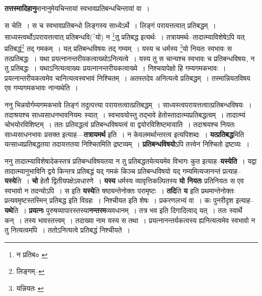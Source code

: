 \documentclass[article,12pt,a4paper]{memoir}
\newcommand{\unclear}[1]{($^{?}$#1)}
\begin{document}
	  \pstart \textbf{तत्तस्मादिहानु}मानानुमेयचिन्तायां स्वभावप्रतिबन्धचिन्तायां वा ।
	\pend
	  \bigskip
	  \begingroup
	

	  \pstart स चेति । स च स्वभावप्रतिबन्धो लिङ्गस्य साध्येऽर्थे । लिङ्गं परायत्तत्वात् प्रतिबद्धम् । साध्यस्त्वर्थोऽपरायत्तत्वात् प्रतिबन्धवि\unclear{यो} न \footnote{न प्रतिब० \cite{dp-msA} \cite{dp-msB} \cite{dp-msD} \cite{dp-edP} \cite{dp-edH} \cite{dp-edE} \cite{dp-edN}}\-तु प्रतिबद्ध इत्यर्थः । तत्रायमर्थः--तादात्म्याविशेषेऽपि यत् प्रतिबद्धं\footnote{लिङ्गम्--\cite{dp-msD-n}} तद् गमकम् । यत् प्रतिबन्धविषयः तद् गम्यम् । यस्य च धर्मस्य \footnote{यन्नियतः \cite{dp-msA} \cite{dp-msB} \cite{dp-msC} \cite{dp-msD} \cite{dp-edP} \cite{dp-edH} \cite{dp-edE} \cite{dp-edN}}\-यो नियतः स्वभावः स तत्प्रतिबद्धः । यथा प्रयत्नानन्तरीयकत्वाख्योऽनित्यत्वे । यस्य तु स चान्यश्च स्वभावः च प्रतिबन्धविषयः, न तु प्रतिबद्धः । यथाऽनित्यत्वाख्यः प्रयत्नानन्तरीयकत्वाख्ये । निश्चयापेक्षो हि गम्यगमकभावः । प्रयत्नान्तरीयकत्वमेव चानित्यत्वस्वभावं निश्चितम् । अतस्तदेव अनित्यत्वे प्रतिबद्धम् । तस्मान्नियतविषय एव गम्यगमकभावः नान्यथेति ।
	\pend
      
	  \endgroup
	

	  \pstart ननु भिन्नयोर्गम्यगमकभावे लिङ्गं तदुत्पत्त्या परायत्तत्वात्प्रतिबद्धम् । साध्यस्त्वपरायत्तत्वात्प्रतिबन्धविषयः । तदाश्रयश्च साध्यसाधनभावनियमः स्यात् । स्वभावयोस्तु तद्भावे हेतोस्तादात्म्यप्रतिबद्धत्वम् । तादात्म्यं चोभयोरविशिष्टम् । ततः प्रतिवद्धत्वं प्रतिबन्धविषयत्वं वा द्वयोरविशिष्टमायाति । तदाश्रयश्च नियतः साध्यसाधनभावः प्रसक्त इत्याह—\textbf{तत्रायमर्थ} इति । न केवलमर्थान्तरत्व इत्यपिशब्दः । \textbf{यत्प्रतिबद्ध}मिति यत्साध्यप्रतिबद्धतया तदायत्ततया निश्चितमिति द्रष्टव्यम् । \textbf{प्रतिबन्धविषयो}ऽपि तत्त्वेन निश्चितो द्रष्टव्यः ।
	\pend
      

	  \pstart ननु तादात्म्याविशेषादेकस्तत्र प्रतिबन्धविषयतया न तु प्रतिबद्धतयेत्ययमेव विभागः कुत इत्याह--\textbf{यस्येति} । यद्वा तादात्म्यानुभाविनि द्वये किन्तत्र प्रतिबद्धं यद् गमकं किञ्च प्रतिबन्धविषयो यद् गम्यमित्यजानन्तं प्रत्याह--\textbf{यस्ये}ति । \textbf{चो} हेतौ द्वितीयपक्षेऽवधारणे । \textbf{यस्य} धर्मस्य व्यावृत्तिकल्पितस्य \textbf{यो नियतः} प्रतिनियतः स एव स्वभावो न तदन्योऽपि । स इति \textbf{यस्ये}ति षष्ठ्यन्तेनोक्तः परामृष्टः । \textbf{तदि}ति \textbf{य} इति प्रथमान्तेनोक्तः प्रत्यवमृष्टस्तस्मिन् प्रतिबद्ध इति विग्रहः । निश्चीयत इति शेषः । प्रकरणलभ्यं वा । कः पुनरीदृश इत्याह--\textbf{यथे}ति । \textbf{प्रयत्नः} पुरुषव्यापारस्तस्या\textbf{नन्तरम}व्यवधानम् । तत्र भव इति दिगादित्वाद् यत् । ततः स्वार्थे कन् । तस्य भावस्तत्त्वम् । तदाख्या नाम यस्य स तथा । प्रयत्नानन्तर्यकत्वस्य ह्यनित्यत्वमेव स्वभावो न तु नित्यत्वमपि । ततोऽनित्यत्वे प्रतिबद्धं निश्चीयते ।
	\pend
      
\end{document}

